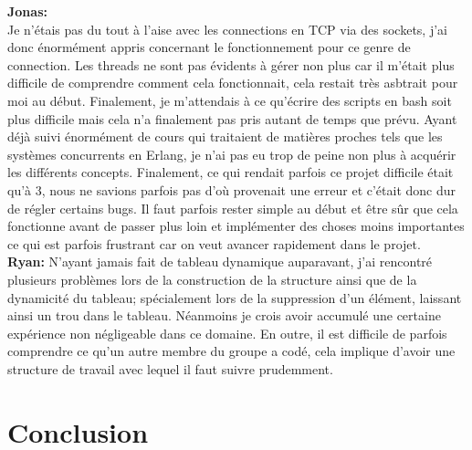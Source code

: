 \documentclass[11pt,a4paper]{article}
\begin{document}
\textbf{Jonas:}\\
Je n'étais pas du tout à l'aise avec les connections en TCP via des sockets, j'ai donc énormément appris concernant le fonctionnement pour ce genre de connection. Les threads ne sont pas évidents à gérer non plus car il m'était plus difficile de comprendre comment cela fonctionnait, cela restait très asbtrait pour moi au début. Finalement, je m'attendais à ce qu'écrire des scripts en bash soit plus difficile mais cela n'a finalement pas pris autant de temps que prévu. Ayant déjà suivi énormément de cours qui traitaient de matières proches tels que les systèmes concurrents en Erlang, je n'ai pas eu trop de peine non plus à acquérir les différents concepts. Finalement, ce qui rendait parfois ce projet difficile était qu'à 3, nous ne savions parfois pas d'où provenait une erreur et c'était donc dur de régler certains bugs. Il faut parfois rester simple au début et être sûr que cela fonctionne avant de passer plus loin et implémenter des choses moins importantes ce qui est parfois frustrant car on veut avancer rapidement dans le projet.\\
\textbf{Ryan:} N'ayant jamais fait de tableau dynamique auparavant, j'ai rencontré plusieurs problèmes lors de la construction de la structure ainsi que de la dynamicité du tableau; spécialement lors de la suppression d'un élément, laissant ainsi un trou dans le tableau. Néanmoins je crois avoir accumulé une certaine expérience non négligeable dans ce domaine. En outre, il est difficile de parfois comprendre ce qu'un autre membre du groupe a codé, cela implique d'avoir une structure de travail avec lequel il faut suivre prudemment.  

\section{Conclusion}


\end{document}
